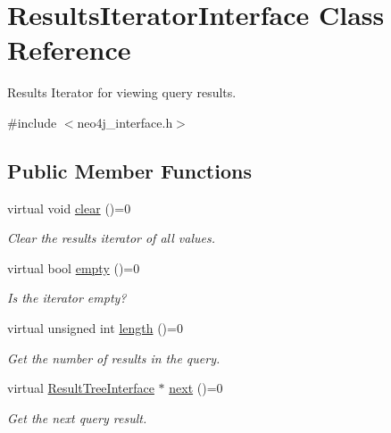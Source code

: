 \hypertarget{classResultsIteratorInterface}{}\section{Results\+Iterator\+Interface Class Reference}
\label{classResultsIteratorInterface}


Results Iterator for viewing query results.  




{\ttfamily \#include $<$neo4j\+\_\+interface.\+h$>$}

\subsection*{Public Member Functions}
\begin{DoxyCompactItemize}
\item 
virtual void \hyperlink{classResultsIteratorInterface_a4f6574b8a57dbd2ea3c86e66bf260252}{clear} ()=0\hypertarget{classResultsIteratorInterface_a4f6574b8a57dbd2ea3c86e66bf260252}{}\label{classResultsIteratorInterface_a4f6574b8a57dbd2ea3c86e66bf260252}

\begin{DoxyCompactList}\small\item\em Clear the results iterator of all values. \end{DoxyCompactList}\item 
virtual bool \hyperlink{classResultsIteratorInterface_ab00e99e5bd9f186eb9bdcdf30d594b99}{empty} ()=0
\begin{DoxyCompactList}\small\item\em Is the iterator empty? \end{DoxyCompactList}\item 
virtual unsigned int \hyperlink{classResultsIteratorInterface_a9a022aba2a3e7771c8d147885ca151dd}{length} ()=0\hypertarget{classResultsIteratorInterface_a9a022aba2a3e7771c8d147885ca151dd}{}\label{classResultsIteratorInterface_a9a022aba2a3e7771c8d147885ca151dd}

\begin{DoxyCompactList}\small\item\em Get the number of results in the query. \end{DoxyCompactList}\item 
virtual \hyperlink{classResultTreeInterface}{Result\+Tree\+Interface} $\ast$ \hyperlink{classResultsIteratorInterface_a00385bfa8ddabb267cf46006a9a0f6e9}{next} ()=0\hypertarget{classResultsIteratorInterface_a00385bfa8ddabb267cf46006a9a0f6e9}{}\label{classResultsIteratorInterface_a00385bfa8ddabb267cf46006a9a0f6e9}

\begin{DoxyCompactList}\small\item\em Get the next query result. \end{DoxyCompactList}\end{DoxyCompactItemize}


